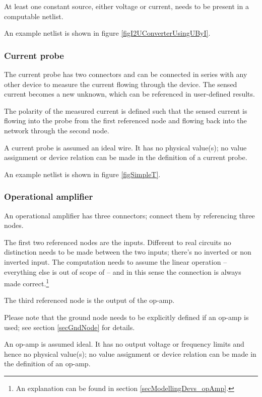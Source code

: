 At least one constant source, either voltage or current, needs to be
present in a computable netlist.

An example netlist is shown in figure \ref{figI2UConverterUsingUByI}.


\subsubsection{Current probe }
\label{secSyntaxCurrentProbe}

The current probe  has two connectors and can be connected in
series with any other device to measure the current flowing through the
device. The sensed current becomes a new unknown, which can be
referenced in user-defined results.

The polarity of the measured current is defined such that the sensed
current is flowing into the probe from the first referenced node and
flowing back into the network through the second node.

A current probe is assumed an ideal wire. It has no physical value(s); no
value assignment or device relation can be made in the definition of a
current probe.

An example netlist is shown in figure \ref{figSimpleT}.


\subsubsection{Operational amplifier }

An operational amplifier  has three connectors; connect them by
referencing three nodes.

The first two referenced nodes are the inputs. Different to real
circuits no distinction needs to be made between the two inputs; there's
no inverted or non inverted input. The computation needs to assume the linear
operation -- everything else is out of scope of \linnet{} -- and in this
sense the connection is always made correct.\footnote{An explanation can
be found in section \ref{secModellingDevs_opAmp}.}

The third referenced node is the output of the op-amp.

Please note that the ground node needs to be explicitly defined if an
op-amp is used; see section \ref{secGndNode} for details.

An op-amp is assumed ideal. It has no output voltage or frequency limits
and hence no physical value(s); no value assignment or device relation can
be made in the definition of an op-amp.

